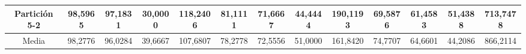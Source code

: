 \documentclass[12pt]{article}
\begin{document}
\begin{table}[H]
{\begin{tabular}{|c|cccc|cccc|cccc|}
Partición 5-2 & \multicolumn{1}{c|}{98,5965}                                                  & \multicolumn{1}{c|}{97,1831}                                                 & \multicolumn{1}{c|}{30,0000} & 118,2406 & \multicolumn{1}{c|}{81,1111}                                                  & \multicolumn{1}{c|}{71,6667}                                                 & \multicolumn{1}{c|}{44,4444} & 190,1193 & \multicolumn{1}{c|}{69,5876}                                                  & \multicolumn{1}{c|}{61,4583}                                                 & \multicolumn{1}{c|}{51,4388} & 713,7478  \\ \hline
Media         & \multicolumn{1}{c|}{98,2776}                                                  & \multicolumn{1}{c|}{96,0284}                                                 & \multicolumn{1}{c|}{39,6667} & 107,6807 & \multicolumn{1}{c|}{78,2778}                                                  & \multicolumn{1}{c|}{72,5556}                                                 & \multicolumn{1}{c|}{51,0000} & 161,8420 & \multicolumn{1}{c|}{74,7707}                                                  & \multicolumn{1}{c|}{64,6601}                                                 & \multicolumn{1}{c|}{44,2086} & 866,2114  \\ \hline
\end{tabular}}
\end{table}
\end{document}
